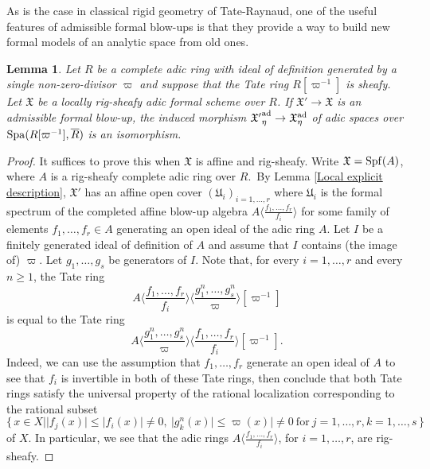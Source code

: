 \documentclass[12pt,twoside,a4paper]{article}
\newtheorem{lemma}[thm]{Lemma}
\theoremstyle{definition}
\theoremstyle{remark}
\newcommand\ad{{\rm ad}}
\newcommand\Spa{{\rm Spa}}
\newcommand\Spf{{\rm Spf}}
\begin{document}
As is the case in classical rigid geometry of Tate-Raynaud, one of the useful features of admissible formal blow-ups is that they provide a way to build new formal models of an analytic space from old ones. 
\begin{lemma}\label{Admissible formal blow-ups and generic fiber}Let $R$ be a complete adic ring with ideal of definition generated by a single non-zero-divisor $\varpi$ and suppose that the Tate ring $R[\varpi^{-1}]$ is sheafy. Let $\mathfrak{X}$ be a locally rig-sheafy adic formal scheme over $R$. If $\mathfrak{X}'\to \mathfrak{X}$ is an admissible formal blow-up, the induced morphism ${\mathfrak{X}'}_{\eta}^{\ad}\to \mathfrak{X}_{\eta}^{\ad}$ of adic spaces over $\Spa(R[\varpi^{-1}], \overline{R})$ is an isomorphism.\end{lemma}
\begin{proof}It suffices to prove this when $\mathfrak{X}$ is affine and rig-sheafy. Write $\mathfrak{X}=\Spf(A)$, where $A$ is a rig-sheafy complete adic ring over $R$. By Lemma \ref{Local explicit description}, $\mathfrak{X}'$ has an affine open cover $(\mathfrak{U}_{i})_{i=1,\dots,r}$ where $\mathfrak{U}_{i}$ is the formal spectrum of the completed affine blow-up algebra $A\langle\frac{f_1,\dots, f_r}{f_i}\rangle$ for some family of elements $f_1,\dots, f_r\in A$ generating an open ideal of the adic ring $A$. Let $I$ be a finitely generated ideal of definition of $A$ and assume that $I$ contains (the image of) $\varpi$. Let $g_1,\dots, g_s$ be generators of $I$. Note that, for every $i=1,\dots, r$ and every $n\geq 1$, the Tate ring \begin{equation*}A\langle\frac{f_1,\dots, f_r}{f_{i}}\rangle\langle\frac{g_1^{n},\dots, g_s^{n}}{\varpi}\rangle[\varpi^{-1}]\end{equation*}is equal to the Tate ring \begin{equation*}A\langle\frac{g_1^{n},\dots, g_s^{n}}{\varpi}\rangle\langle\frac{f_1,\dots, f_r}{f_{i}}\rangle[\varpi^{-1}].\end{equation*}Indeed, we can use the assumption that $f_1,\dots, f_r$ generate an open ideal of $A$ to see that $f_{i}$ is invertible in both of these Tate rings, then conclude that both Tate rings satisfy the universal property of the rational localization corresponding to the rational subset \begin{equation*}\{\, x\in X\mid \vert f_{j}(x)\vert\leq \vert f_{i}(x)\vert\neq 0, \ \vert g_k^{n}(x)\vert\leq\varpi(x)\vert\neq 0\ \text{for} \ j=1,\dots, r, k=1,\dots, s\,\}\end{equation*}of $X$. In particular, we see that the adic rings $A\langle\frac{f_1,\dots, f_r}{f_{i}}\rangle$, for $i=1,\dots, r$, are rig-sheafy.


\end{proof}
\end{document}
